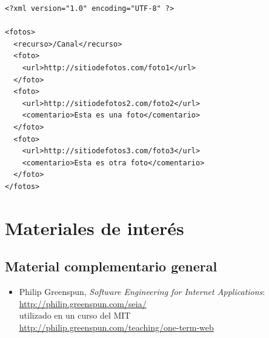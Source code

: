\begin{verbatim}
<?xml version="1.0" encoding="UTF-8" ?>

<fotos>
  <recurso>/Canal</recurso>
  <foto>
    <url>http://sitiodefotos.com/foto1</url>
  </foto>
  <foto>
    <url>http://sitiodefotos2.com/foto2</url>
    <comentario>Esta es una foto</comentario>
  </foto>
  <foto>
    <url>http://sitiodefotos3.com/foto3</url>
    <comentario>Esta es otra foto</comentario>
  </foto>
</fotos>
\end{verbatim}

\newpage



\newpage



\newpage



\newpage



\newpage



\newpage



\newpage



\newpage
\section{Materiales de interés}

\subsection{Material complementario general}

\begin{itemize}
\item Philip Greenspun, \textsl{Software Engineering for Internet Applications}:\\
  \url{http://philip.greenspun.com/seia/} \\
  utilizado en un curso del MIT \\
  \url{http://philip.greenspun.com/teaching/one-term-web}
\end{itemize}

